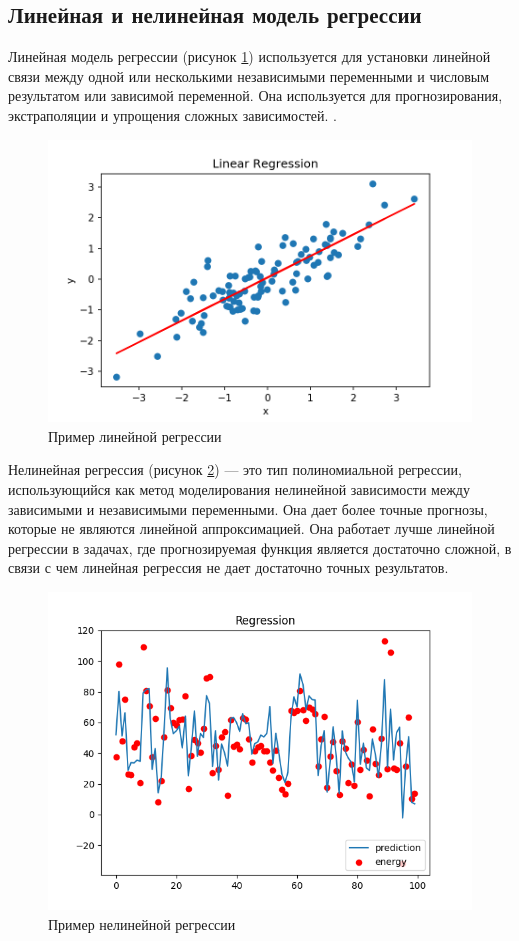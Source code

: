 \subsection{Линейная и нелинейная модель регрессии}
Линейная модель регрессии (рисунок \ref{fig:2}) используется для установки линейной связи между одной или несколькими независимыми переменными и числовым результатом или зависимой переменной. Она используется для прогнозирования, экстраполяции и упрощения сложных зависимостей.
\cite{17,25}.

\begin{figure}[ht] 
  \center
  \includegraphics [scale=0.5] {img/linear_reg.png}
  \caption{Пример линейной регрессии} 
  \label{fig:2}  
\end{figure}
\newpage
Нелинейная регрессия (рисунок \ref{fig:3})  — это тип полиномиальной регрессии, использующийся как метод моделирования нелинейной зависимости между зависимыми и независимыми переменными. Она дает более точные прогнозы, которые не являются линейной аппроксимацией. Она работает лучше линейной регрессии в задачах, где прогнозируемая функция является достаточно сложной, в связи с чем линейная регрессия не дает достаточно точных результатов.\cite{29, 30}


\begin{figure}[ht] 
  \center
  \includegraphics [scale=0.9] {img/non_linear_reg.png}
  \caption{Пример нелинейной регрессии} 
  \label{fig:3}  
\end{figure}
\newpage
